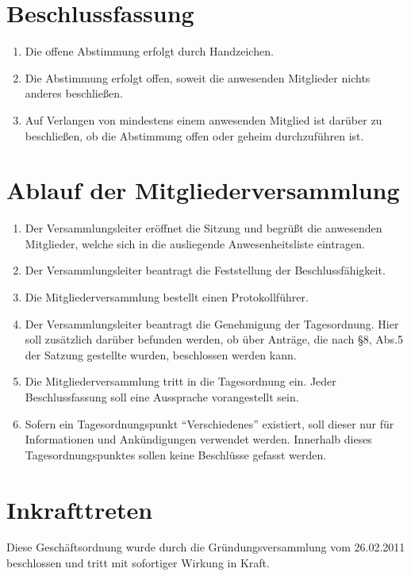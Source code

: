 \documentclass[a4paper, 12pt]{scrartcl}
\begin{document}
\section{Beschlussfassung}
\begin{enumerate}
	\item Die offene Abstimmung erfolgt durch Handzeichen.
	\item Die Abstimmung erfolgt offen, soweit die anwesenden Mitglieder nichts anderes beschließen.
	\item Auf Verlangen von mindestens einem anwesenden Mitglied ist darüber zu
beschließen, ob die Abstimmung offen oder geheim durchzuführen ist.
\end{enumerate}

\section{Ablauf der Mitgliederversammlung}
\begin{enumerate} 
	\item Der Versammlungsleiter eröffnet die Sitzung und begrüßt die anwesenden Mitglieder, welche sich in die ausliegende Anwesenheitsliste eintragen.
	\item Der Versammlungsleiter beantragt die Feststellung der Beschlussfähigkeit.
	\item Die Mitgliederversammlung bestellt einen Protokollführer.
	\item Der Versammlungsleiter beantragt die Genehmigung der Tagesordnung. Hier soll zusätzlich darüber befunden werden, ob über Anträge, die nach §8, Abs.5 der Satzung gestellte wurden, beschlossen werden kann.
	\item Die Mitgliederversammlung tritt in die Tagesordnung ein. Jeder Beschlussfassung soll eine Aussprache vorangestellt sein.
	\item Sofern ein Tagesordnungspunkt "`Verschiedenes"' existiert, soll dieser nur für Informationen und Ankündigungen verwendet werden. Innerhalb dieses Tagesordnungspunktes sollen keine Beschlüsse gefasst werden.
\end{enumerate}

\section{Inkrafttreten}
Diese Geschäftsordnung wurde durch die 
Gründungsversammlung
vom 26.02.2011 beschlossen und tritt mit sofortiger Wirkung in Kraft.\\
\end{document}
